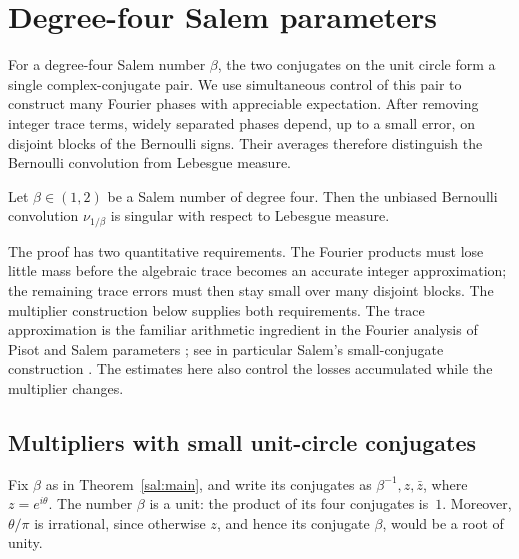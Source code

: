 \section{Degree-four Salem parameters}\label{sal:section}

For a degree-four Salem number $\beta$, the two conjugates on the unit
circle form a single complex-conjugate pair.  We use simultaneous control
of this pair to construct many Fourier phases with appreciable expectation.
After removing integer trace terms, widely separated phases depend, up to a
small error, on disjoint blocks of the Bernoulli signs.  Their averages
therefore distinguish the Bernoulli convolution from Lebesgue measure.

\begin{theorem}\label{sal:main}
Let $\beta\in(1,2)$ be a Salem number of degree four.  Then the unbiased
Bernoulli convolution $\nu_{1/\beta}$ is singular with respect to Lebesgue
measure.
\end{theorem}

The proof has two quantitative requirements.  The Fourier products must
lose little mass before the algebraic trace becomes an accurate integer
approximation; the remaining trace errors must then stay small over many
disjoint blocks.  The multiplier construction below supplies both
requirements.  The trace approximation is the familiar arithmetic
ingredient in the Fourier analysis of Pisot and Salem parameters
\cite{Erdos1939}; see in particular Salem's small-conjugate construction
\cite[Chapter~III, Section~3, Theorem~III, pp.~28--29]{Salem1963}.
The estimates here also control the losses
accumulated while the multiplier changes.

\subsection{Multipliers with small unit-circle conjugates}

Fix $\beta$ as in Theorem~\ref{sal:main}, and write its conjugates as
$\beta^{-1},z,\bar z$, where $z=e^{i\theta}$.  The number $\beta$ is a unit:
the product of its four conjugates is~$1$.  Moreover, $\theta/\pi$ is
irrational, since otherwise $z$, and hence its conjugate $\beta$, would be
a root of unity.

